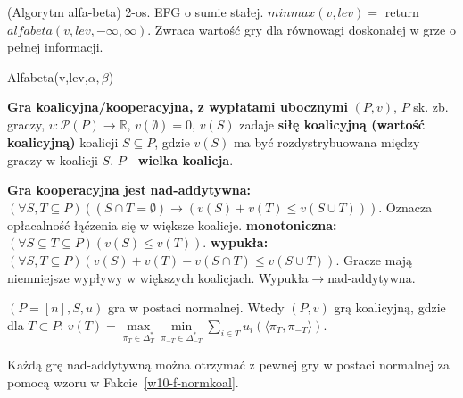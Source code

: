\begin{twierdzenie}{(Algorytm alfa-beta)}
    2-os. EFG o sumie stałej. $minmax(v,lev)=$ return $alfabeta(v,lev,-\infty,\infty)$. Zwraca wartość gry dla równowagi doskonałej w grze o pełnej informacji.
\end{twierdzenie}
\begin{algorithm}[H]
    \SetAlgoLined
    
    \caption{Alfabeta(v,lev,$\alpha,\beta$)}
\end{algorithm}
\begin{definicja}{\textbf{Gra koalicyjna/kooperacyjna, z wypłatami ubocznymi}}
    $(P,v)$, $P$ sk. zb. graczy, $v:\mathcal{P}(P)\rightarrow\mathbb{R}$, $v(\emptyset)=0$, $v(S)$ zadaje 
    \textbf{siłę koalicyjną (wartość koalicyjną)} koalicji $S\subseteq P$, gdzie $v(S)$ ma być rozdystrybuowana między graczy w koalicji $S$.
    $P$ - \textbf{wielka koalicja}.
\end{definicja}
\begin{definicja}{\textbf{Gra kooperacyjna jest}}
    \textbf{nad-addytywna: } $(\forall S,T\subseteq P) ((S\cap T=\emptyset)\rightarrow(v(S)+v(T)\leq v(S\cup T)))$. Oznacza opłacalność łąćzenia się w większe koalicje.
    \textbf{monotoniczna: } $(\forall S\subseteq T\subseteq P) (v(S)\leq v(T))$.
    \textbf{wypukła: } $(\forall S,T\subseteq P) (v(S)+v(T)-v(S\cap T)\leq v(S\cup T))$. Gracze mają niemniejsze wypływy w większych koalicjach. Wypukła$\rightarrow$nad-addytywna.
\end{definicja}
\begin{fakt}\label{w10-f-normkoal}
    $(P=[n],S,u)$ gra w postaci normalnej. Wtedy $(P,v)$ grą koalicyjną, gdzie dla $T\subset P$: 
    $v(T)=\max\limits_{\pi_T\in\Delta_T^*}\min\limits_{\pi_{-T}\in\Delta_{-T}^*}\sum\limits_{i\in T}{u_i(\langle \pi_T,\pi_{-T} \rangle)}$.
\end{fakt}
\begin{fakt}
    Każdą grę nad-addytywną można otrzymać z pewnej gry w postaci normalnej za pomocą wzoru w Fakcie~\ref{w10-f-normkoal}.
\end{fakt}
